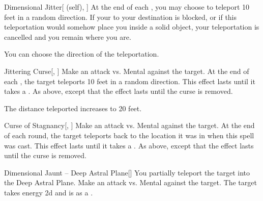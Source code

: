 \lowercase{\hypertarget{spell:Dimensional Jitter}{}}\label{spell:Dimensional Jitter}
\begin{attuneability}[Rank 5]{\hypertarget{spell:Dimensional Jitter}{Dimensional Jitter}}[ (self), ]
At the end of each , you may choose to teleport 10 feet in a random direction.
If your  to your destination is blocked, or if this teleportation would somehow place you inside a solid object, your teleportation is cancelled and you remain where you are.

\rankline
{} You can choose the direction of the teleportation.
\end{attuneability}
\vspace{0.25em}



\lowercase{\hypertarget{spell:Jittering Curse}{}}\label{spell:Jittering Curse}
\begin{freeability}[Rank 6]{\hypertarget{spell:Jittering Curse}{Jittering Curse}}[, ]
Make an attack vs. Mental against the target.
\hit At the end of each , the target teleports 10 feet in a random direction.
This effect lasts until it takes a .
\crit As above, except that the effect lasts until the curse is removed.

\rankline
{} The distance teleported increases to 20 feet.
\end{freeability}
\vspace{0.25em}



\lowercase{\hypertarget{spell:Curse of Stagnancy}{}}\label{spell:Curse of Stagnancy}
\begin{freeability}[Rank 8]{\hypertarget{spell:Curse of Stagnancy}{Curse of Stagnancy}}[, ]
Make an attack vs. Mental against the target.
\hit At the end of each round, the target teleports back to the location it was in
when this spell was cast.
This effect lasts until it takes a .
\crit As above, except that the effect lasts until the curse is removed.
\end{freeability}
\vspace{0.25em}



\lowercase{\hypertarget{spell:Dimensional Jaunt -- Deep Astral Plane}{}}\label{spell:Dimensional Jaunt -- Deep Astral Plane}
\begin{freeability}[Rank 8]{\hypertarget{spell:Dimensional Jaunt -- Deep Astral Plane}{Dimensional Jaunt -- Deep Astral Plane}}[]
You partially teleport the target into the Deep Astral Plane.
Make an attack vs. Mental against the target.
\hit The target takes energy  \minus2d and is  as a .
\end{freeability}
\vspace{0.25em}



